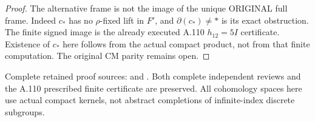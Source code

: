 \begin{proof}
The alternative frame is not the image of the unique ORIGINAL
full frame. Indeed \(c_*\) has no \(\rho\)-fixed lift in \(F'\),
and \(\partial(c_*)\ne*\) is its exact obstruction.
The finite signed image is the already executed A.110
\(h_{12}=5I\) certificate. Existence of \(c_*\) here follows
from the actual compact product, not from that finite computation.
The original CM parity remains open.
\end{proof}

\begingroup\footnotesize\raggedright
Complete retained proof sources:
and .
Both complete independent reviews and the A.110 prescribed
finite certificate are preserved. All cohomology spaces here
use actual compact kernels, not abstract completions of
infinite-index discrete subgroups.\par\endgroup

